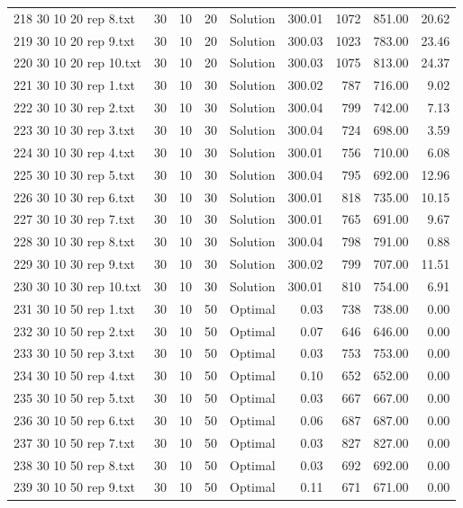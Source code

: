 \begin{longtable}{lrrllrrrr}
218 30 10 20 rep 8.txt & 30 & 10 & 20 & Solution & 300.01 & 1072 & 851.00 & 20.62\\
219 30 10 20 rep 9.txt & 30 & 10 & 20 & Solution & 300.03 & 1023 & 783.00 & 23.46\\
220 30 10 20 rep 10.txt & 30 & 10 & 20 & Solution & 300.03 & 1075 & 813.00 & 24.37\\
221 30 10 30 rep 1.txt & 30 & 10 & 30 & Solution & 300.02 & 787 & 716.00 &  9.02\\
222 30 10 30 rep 2.txt & 30 & 10 & 30 & Solution & 300.04 & 799 & 742.00 &  7.13\\
223 30 10 30 rep 3.txt & 30 & 10 & 30 & Solution & 300.04 & 724 & 698.00 &  3.59\\
224 30 10 30 rep 4.txt & 30 & 10 & 30 & Solution & 300.01 & 756 & 710.00 &  6.08\\
225 30 10 30 rep 5.txt & 30 & 10 & 30 & Solution & 300.04 & 795 & 692.00 & 12.96\\
226 30 10 30 rep 6.txt & 30 & 10 & 30 & Solution & 300.01 & 818 & 735.00 & 10.15\\
227 30 10 30 rep 7.txt & 30 & 10 & 30 & Solution & 300.01 & 765 & 691.00 &  9.67\\
228 30 10 30 rep 8.txt & 30 & 10 & 30 & Solution & 300.04 & 798 & 791.00 &  0.88\\
229 30 10 30 rep 9.txt & 30 & 10 & 30 & Solution & 300.02 & 799 & 707.00 & 11.51\\
230 30 10 30 rep 10.txt & 30 & 10 & 30 & Solution & 300.01 & 810 & 754.00 &  6.91\\
231 30 10 50 rep 1.txt & 30 & 10 & 50 & Optimal &  0.03 & 738 & 738.00 &  0.00\\
232 30 10 50 rep 2.txt & 30 & 10 & 50 & Optimal &  0.07 & 646 & 646.00 &  0.00\\
233 30 10 50 rep 3.txt & 30 & 10 & 50 & Optimal &  0.03 & 753 & 753.00 &  0.00\\
234 30 10 50 rep 4.txt & 30 & 10 & 50 & Optimal &  0.10 & 652 & 652.00 &  0.00\\
235 30 10 50 rep 5.txt & 30 & 10 & 50 & Optimal &  0.03 & 667 & 667.00 &  0.00\\
236 30 10 50 rep 6.txt & 30 & 10 & 50 & Optimal &  0.06 & 687 & 687.00 &  0.00\\
237 30 10 50 rep 7.txt & 30 & 10 & 50 & Optimal &  0.03 & 827 & 827.00 &  0.00\\
238 30 10 50 rep 8.txt & 30 & 10 & 50 & Optimal &  0.03 & 692 & 692.00 &  0.00\\
239 30 10 50 rep 9.txt & 30 & 10 & 50 & Optimal &  0.11 & 671 & 671.00 &  0.00\\

\end{longtable}
